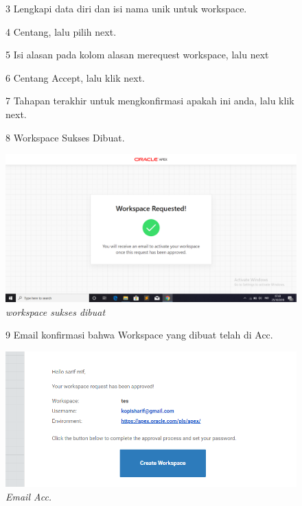 \begin{enumerate}
\begin{figure}[!htbp]
\item[3]Lengkapi data diri dan isi nama unik  untuk workspace.

        
\item[4]Centang, lalu pilih next.  

      
\item[5]Isi alasan pada kolom alasan merequest workspace, lalu next

 
\item[6] Centang Accept, lalu klik next.


\item[7] Tahapan terakhir untuk mengkonfirmasi apakah ini anda, lalu klik next.

   
\item[8] Workspace Sukses Dibuat.

    \begin{center}
\includegraphics[scale=0.2]{apex/apex3.png}
    \caption{\textit{workspace sukses dibuat}}
        \end{center}
\label{gambar}
\end{figure}

\begin{figure}
\item[9] Email konfirmasi bahwa Workspace yang dibuat telah di Acc.

    \begin{center}
\includegraphics[scale=0.4]{apex/apex4.png}
    \caption{\textit{Email Acc.}}
        \end{center}
\label{gambar}
\end{figure}


\end{enumerate}
